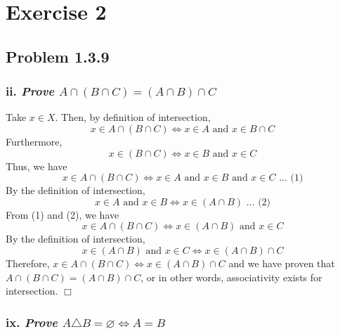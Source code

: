 \documentclass[
]{article}
\begin{document}
\hypertarget{exercise-2}{%
\section{Exercise 2}\label{exercise-2}}

\hypertarget{problem-1.3.9}{%
\subsection{Problem 1.3.9}\label{problem-1.3.9}}

\hypertarget{ii.-prove-a-cap-b-cap-c-a-cap-b-cap-c}{%
\subsubsection{\texorpdfstring{ii. \emph{Prove
\(A \cap (B \cap C) = (A \cap B) \cap C\)}}{ii. Prove A \textbackslash cap (B \textbackslash cap C) = (A \textbackslash cap B) \textbackslash cap C}}\label{ii.-prove-a-cap-b-cap-c-a-cap-b-cap-c}}

Take \(x \in X\). Then, by definition of intersection,
\[x \in A \cap (B \cap C) \iff x \in A \text{ and }x \in B \cap C\]
Furthermore, \[x \in (B \cap C) \iff x \in B \text{ and }x \in C\] Thus,
we have\\
\[ x \in A \cap (B \cap C) \iff x \in A \text{ and }x \in B \text{ and }x \in C \text{ ... (1)}\]
By the definition of intersection,
\[ x \in A \text{ and }x \in B \iff x \in (A \cap B) \text{ ... (2)}\]
From (1) and (2), we have
\[x \in A \cap (B \cap C) \iff x \in (A \cap B) \text{ and }x \in C\] By
the definition of intersection,
\[x \in (A \cap B) \text{ and }x \in C \iff x \in (A \cap B) \cap C\]
Therefore, \(x \in A \cap (B \cap C) \iff x \in (A \cap B) \cap C\) and
we have proven that \(A \cap (B \cap C) = (A \cap B) \cap C\), or in
other words, associativity exists for intersection. \hfill \(\Box\)

\hypertarget{ix.-prove-a-triangle-b-varnothing-iff-a-b}{%
\subsubsection{\texorpdfstring{ix. \emph{Prove
\(A \triangle B = \varnothing \iff A = B\)}}{ix. Prove A \textbackslash triangle B = \textbackslash varnothing \textbackslash iff A = B}}\label{ix.-prove-a-triangle-b-varnothing-iff-a-b}}
\end{document}
